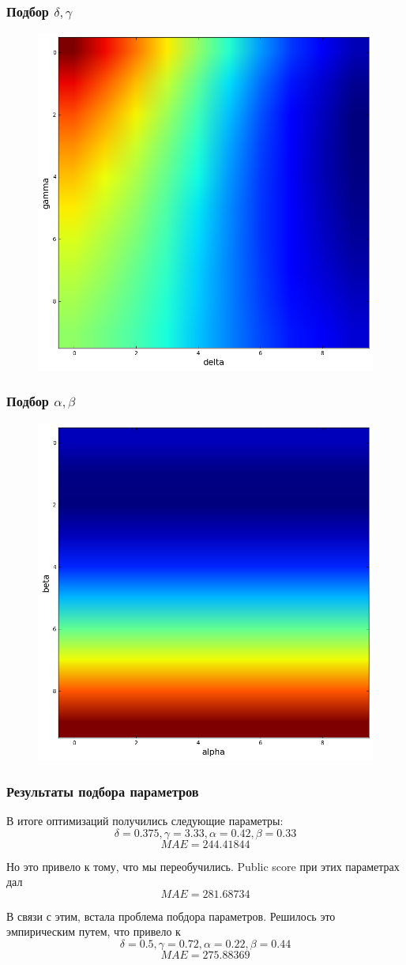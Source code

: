 \documentclass{beamer}
\begin{document}
\begin{frame}
\frametitle{Подбор $\delta, \gamma$}

\begin{figure}
\includegraphics[height=0.5\linewidth]{pics/gamma-delta.png}
\end{figure}

\end{frame}


\begin{frame}
\frametitle{Подбор $\alpha, \beta$}

\begin{figure}
\includegraphics[width=0.5\linewidth]{pics/beta-alpha.png}
\end{figure}

\end{frame}


\begin{frame}
\frametitle{Результаты подбора параметров}

В итоге оптимизаций получились следующие параметры:
$$\delta = 0.375, \gamma = 3.33, \alpha = 0.42, \beta = 0.33$$
$$MAE = 244.41844$$

Но это привело к тому, что мы переобучились. Public score при этих параметрах дал
$$MAE = 281.68734$$

В связи с этим, встала проблема побдора параметров. Решилось это эмпирическим путем, что привело к
$$\delta = 0.5, \gamma = 0.72, \alpha = 0.22, \beta = 0.44$$
$$MAE = 275.88369$$

\end{frame}
\end{document}
